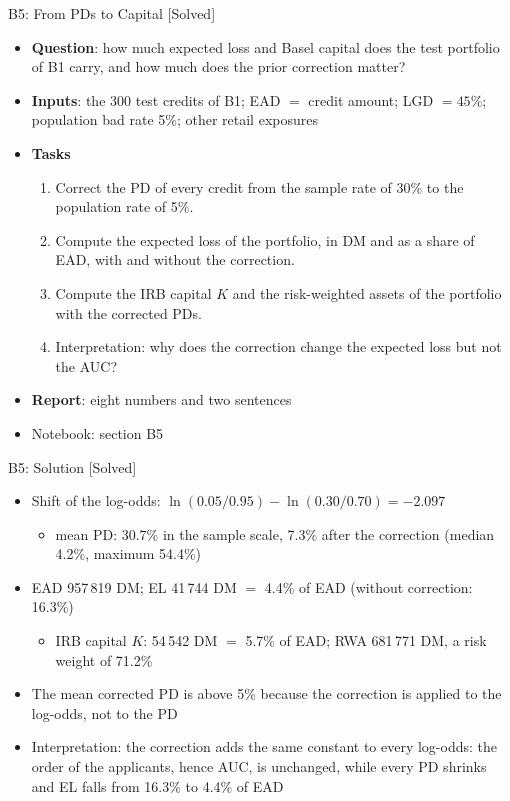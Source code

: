 \begin{frame}{B5: From PDs to Capital [Solved]}
\itemsize{\footnotesize}
\begin{itemize}
\item \textbf{Question}: how much expected loss and Basel capital does the test portfolio of B1 carry, and how much does the prior correction matter?
\item \textbf{Inputs}: the 300 test credits of B1; EAD $=$ credit amount; LGD $= 45\%$; population bad rate 5\%; other retail exposures
\item \textbf{Tasks}
\begin{enumerate}
    \item Correct the PD of every credit from the sample rate of 30\% to the population rate of 5\%.
    \item Compute the expected loss of the portfolio, in DM and as a share of EAD, with and without the correction.
    \item Compute the IRB capital $K$ and the risk-weighted assets of the portfolio with the corrected PDs.
    \item Interpretation: why does the correction change the expected loss but not the AUC?
\end{enumerate}
\item \textbf{Report}: eight numbers and two sentences
\item Notebook: section B5
\end{itemize}
\end{frame}

\begin{frame}{B5: Solution [Solved]}
\itemsize{\footnotesize}
\begin{itemize}
    \item Shift of the log-odds: $\ln(0.05/0.95) - \ln(0.30/0.70) = -2.097$
    \begin{itemize}
        \item mean PD: 30.7\% in the sample scale, 7.3\% after the correction (median 4.2\%, maximum 54.4\%)
    \end{itemize}
    \item EAD 957\,819 DM; EL 41\,744 DM $=$ 4.4\% of EAD (without correction: 16.3\%)
    \begin{itemize}
        \item IRB capital $K$: 54\,542 DM $=$ 5.7\% of EAD; RWA 681\,771 DM, a risk weight of 71.2\%
    \end{itemize}
    \item The mean corrected PD is above 5\% because the correction is applied to the log-odds, not to the PD
    \item Interpretation: the correction adds the same constant to every log-odds: the order of the applicants, hence AUC, is unchanged, while every PD shrinks and EL falls from 16.3\% to 4.4\% of EAD
\end{itemize}
\end{frame}

